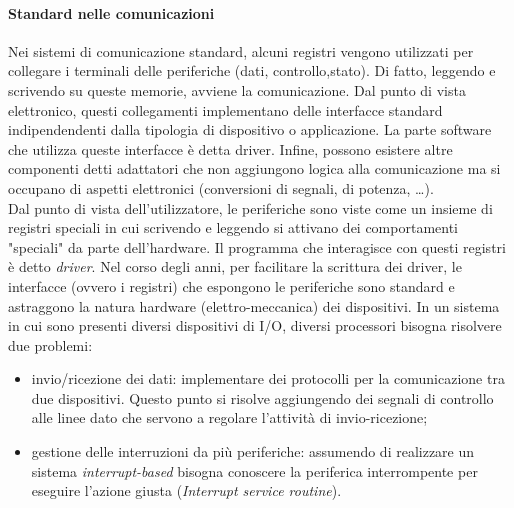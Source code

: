 \documentclass{article}
\begin{document}
\paragraph{Standard nelle comunicazioni}
Nei sistemi di comunicazione standard, alcuni registri vengono utilizzati per 
collegare i terminali delle periferiche (dati, controllo,stato). Di fatto, 
leggendo e scrivendo su queste memorie, avviene la comunicazione. Dal punto di 
vista elettronico, questi collegamenti implementano delle interfacce standard 
indipendendenti dalla tipologia di dispositivo o applicazione. La parte 
software che utilizza queste interfacce è detta driver. Infine, possono 
esistere altre componenti detti adattatori che non aggiungono logica alla 
comunicazione ma si occupano di aspetti elettronici (conversioni di segnali,
di potenza, \dots).\\ 

Dal punto di vista dell'utilizzatore, le periferiche sono viste come un insieme di registri 
speciali in cui scrivendo e leggendo si attivano dei comportamenti "speciali" da parte 
dell'hardware. Il programma che interagisce con questi registri è detto \textit{driver}. 
Nel corso degli anni, per facilitare la scrittura dei driver, le interfacce (ovvero i registri)
che espongono le periferiche sono standard e astraggono la natura hardware (elettro-meccanica)
dei dispositivi. In un sistema in cui sono presenti diversi dispositivi di I/O, diversi 
processori bisogna risolvere due problemi:
\begin{itemize}
  \item invio/ricezione dei dati: implementare dei protocolli per la comunicazione tra due
  dispositivi. Questo punto si risolve aggiungendo dei segnali di controllo alle linee dato 
  che servono a regolare l'attività di invio-ricezione;
  \item gestione delle interruzioni da più periferiche: assumendo di realizzare un sistema 
  \textit{interrupt-based} bisogna conoscere la periferica interrompente per eseguire l'azione
  giusta (\textit{Interrupt service routine}).
\end{itemize}
\end{document}
